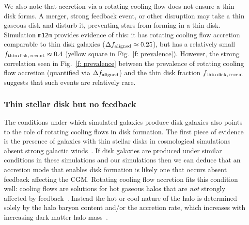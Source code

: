 \documentclass[fleqn,usenatbib]{mnras}
\begin{document}
We also note that accretion via a rotating cooling flow does not ensure a thin disk forms. 
A merger, strong feedback event, or other disruption may take a thin gaseous disk and disturb it, preventing stars from forming in a thin disk.
Simulation \texttt{m12m} provides evidence of this:
it has rotating cooling flow accretion comparable to thin disk galaxies ($\Delta f_{\rm aligned} \approx 0.25$), but has a relatively small $f_{\rm thin\,disk,\,recent} \approx 0.4$ (yellow square in Fig.~\ref{f: prevalence}).
However, the strong correlation seen in Fig.~\ref{f: prevalence} between the prevalence of rotating cooling flow accretion (quantified via $\Delta f_{\rm aligned}$) and the thin disk fraction $f_{\rm thin\,disk,\,recent}$ suggests that such events are relatively rare. 





\subsubsection{Thin stellar disk but no feedback}
The conditions under which simulated galaxies produce disk galaxies also points to the role of rotating cooling flows in disk formation.
The first piece of evidence is the presence of galaxies with thin stellar disks in cosmological simulations absent strong galactic winds~\citep{Guedes2011, Bird2013}.
If disk galaxies are produced under similar conditions in these simulations and our simulations then we can deduce that an accretion mode that enables disk formation is likely one that occurs absent feedback affecting the CGM.
Rotating cooling flow accretion fits this condition well:
cooling flows are solutions for hot gaseous halos that are \textit{not} strongly affected by feedback~\citep{Stern2019}.
Instead the hot or cool nature of the halo is determined solely by the halo baryon content and/or the accretion rate, which increases with increasing dark matter halo mass~\citep{Stern2020}.
\end{document}
